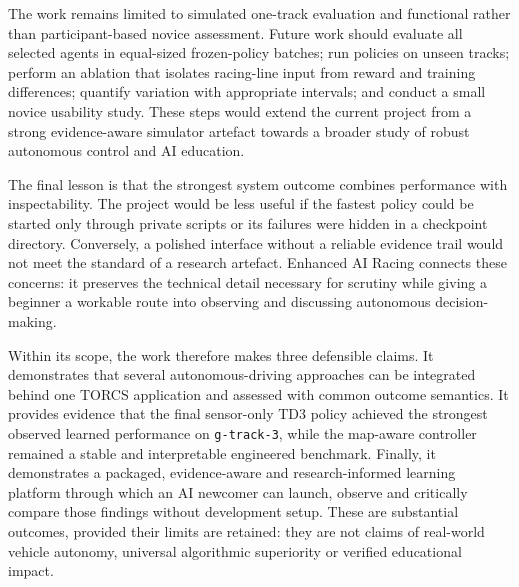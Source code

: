 The work remains limited to simulated one-track evaluation and functional rather than participant-based novice assessment. Future work should evaluate all selected agents in equal-sized frozen-policy batches; run policies on unseen tracks; perform an ablation that isolates racing-line input from reward and training differences; quantify variation with appropriate intervals; and conduct a small novice usability study. These steps would extend the current project from a strong evidence-aware simulator artefact towards a broader study of robust autonomous control and AI education.

The final lesson is that the strongest system outcome combines performance with inspectability. The project would be less useful if the fastest policy could be started only through private scripts or its failures were hidden in a checkpoint directory. Conversely, a polished interface without a reliable evidence trail would not meet the standard of a research artefact. Enhanced AI Racing connects these concerns: it preserves the technical detail necessary for scrutiny while giving a beginner a workable route into observing and discussing autonomous decision-making.

Within its scope, the work therefore makes three defensible claims. It demonstrates that several autonomous-driving approaches can be integrated behind one TORCS application and assessed with common outcome semantics. It provides evidence that the final sensor-only TD3 policy achieved the strongest observed learned performance on \texttt{g-track-3}, while the map-aware controller remained a stable and interpretable engineered benchmark. Finally, it demonstrates a packaged, evidence-aware and research-informed learning platform through which an AI newcomer can launch, observe and critically compare those findings without development setup. These are substantial outcomes, provided their limits are retained: they are not claims of real-world vehicle autonomy, universal algorithmic superiority or verified educational impact.

\printbibliography[heading=bibintoc,title={References}]





